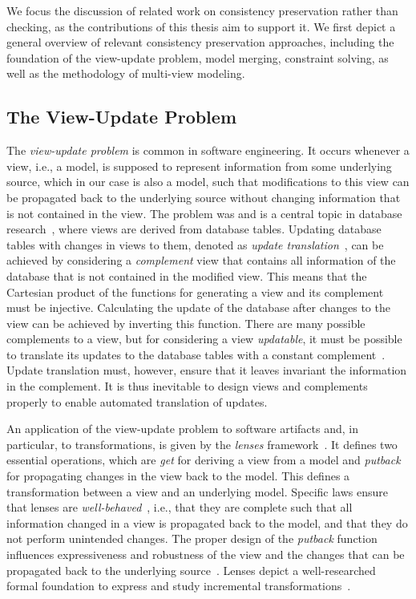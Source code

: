 We focus the discussion of related work on consistency preservation rather than checking, as the contributions of this thesis aim to support it.
We first depict a general overview of relevant consistency preservation approaches, including the foundation of the view-update problem, model merging, constraint solving, as well as the methodology of multi-view modeling.


\subsection{The View-Update Problem}

The \emph{view-update problem} is common in software engineering.
It occurs whenever a view, i.e., a model, is supposed to represent information from some underlying source, which in our case is also a model, such that modifications to this view can be propagated back to the underlying source without changing information that is not contained in the view.
The problem was and is a central topic in database research~\cite{bancilhon1981viewUpdate-TDS, dayal1982viewUpdate-TDS}, where views are derived from database tables.
Updating database tables with changes in views to them, denoted as \emph{update translation}~\cite{bancilhon1981viewUpdate-TDS}, can be achieved by considering a \emph{complement} view that contains all information of the database that is not contained in the modified view.
This means that the Cartesian product of the functions for generating a view and its complement must be injective.
Calculating the update of the database after changes to the view can be achieved by inverting this function.
There are many possible complements to a view, but for considering a view \emph{updatable}, it must be possible to translate its 
updates to the database tables with a constant complement~\cite{bancilhon1981viewUpdate-TDS}.
Update translation must, however, ensure that it leaves invariant the information in the complement.
It is thus inevitable to design views and complements properly to enable automated translation of updates.

An application of the view-update problem to software artifacts and, in particular, to transformations, is given by the \emph{lenses} framework~\cite{foster2005Combinators-POPL, foster2007combinators-TPLS}.
It defines two essential operations, which are \emph{get} for deriving a view from a model and \emph{putback} for propagating changes in the view back to the model.
This defines a transformation between a view and an underlying model.
Specific laws ensure that lenses are \emph{well-behaved}~\cite[Def.~3.2]{foster2007combinators-TPLS}, i.e., that they are complete such that all information changed in a view is propagated back to the model, and that they do not perform unintended changes.
The proper design of the \emph{putback} function influences expressiveness and robustness of the view and the changes that can be propagated back to the underlying source~\cite{foster2007combinators-TPLS}.
Lenses depict a well-researched formal foundation to express and study incremental transformations~\cite{stevens2008bxalgebraic-ICGT}.

